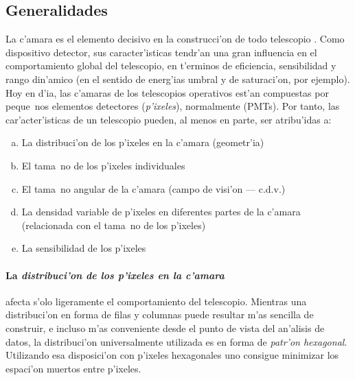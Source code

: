 \subsection{Generalidades}
%
La c'amara es el elemento decisivo en la construcci'on de todo
telescopio \Cherenkov. Como dispositivo detector, sus caracter'isticas
tendr'an una gran influencia en el comportamiento global del
telescopio, en t'erminos de eficiencia, sensibilidad y rango din'amico
(en el sentido de energ'ias umbral y de saturaci'on, por ejemplo). Hoy
en d'ia, las c'amaras de los telescopios \Cherenkov operativos est'an
compuestas por peque~nos elementos detectores (\emph{p'ixeles}),
normalmente \emph{} (PMTs). Por tanto, las
car'acter'isticas de un telescopio \Cherenkov pueden, al menos en
parte, ser atribu'idas a:
%
\begin{enumerate}[a.]
\item La distribuci'on de los p'ixeles en la c'amara (geometr'ia)
\item El tama~no de los p'ixeles individuales
\item El tama~no angular de la c'amara (campo de visi'on --- c.d.v.)
\item La densidad variable de p'ixeles en diferentes partes de la
  c'amara (relacionada con el tama~no de los p'ixeles)
\item La sensibilidad de los p'ixeles
\end{enumerate}

\paragraph{La \emph{distribuci'on de los p'ixeles en la c'amara}} 
afecta s'olo ligeramente el comportamiento del telescopio. Mientras
una distribuci'on en forma de filas y columnas puede resultar m'as
sencilla de construir, e incluso m'as conveniente desde el punto de
vista del an'alisis de datos, la distribuci'on universalmente
utilizada es en forma de \emph{patr'on hexagonal}. Utilizando esa
disposici'on con p'ixeles hexagonales uno consigue minimizar los
espaci'on muertos entre p'ixeles.

